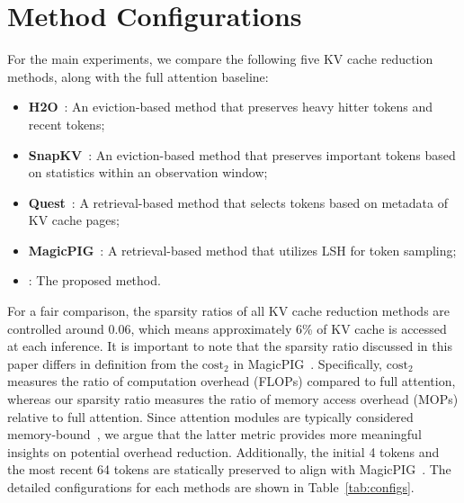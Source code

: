 \section{Method Configurations}

\label{appendix:baselines}

For the main experiments, we compare the following five KV cache reduction methods, along with the full attention baseline:

\begin{itemize}[nosep]
    \item \textbf{H2O}~\citep{h2o}: An eviction-based method that preserves heavy hitter tokens and recent tokens;
    \item \textbf{SnapKV}~\citep{snapkv}: An eviction-based method that preserves important tokens based on statistics within an observation window;
    \item \textbf{Quest}~\cite{quest}: A retrieval-based method that selects tokens based on metadata of KV cache pages;
    \item \textbf{MagicPIG}~\cite{magicpig}: A retrieval-based method that utilizes LSH for token sampling;
    \item \textbf{{\name}}: The proposed method.
\end{itemize}

For a fair comparison, the sparsity ratios of all KV cache reduction methods are controlled around 0.06, which means approximately 6\% of KV cache is accessed at each inference.
It is important to note that the sparsity ratio discussed in this paper differs in definition from the \(\mathrm{cost}_2\) in MagicPIG~\citep{magicpig}. 
Specifically, \(\mathrm{cost}_2\) measures the ratio of computation overhead (FLOPs) compared to full attention, whereas our sparsity ratio measures the ratio of memory access overhead (MOPs) relative to full attention. 
Since attention modules are typically considered memory-bound~\citep{transformer-survey}, we argue that the latter metric provides more meaningful insights on potential overhead reduction.
Additionally, the initial 4 tokens and the most recent 64 tokens are statically preserved to align with MagicPIG~\citep{streaming-llm}.
The detailed configurations for each methods are shown in Table~\ref{tab:configs}.


